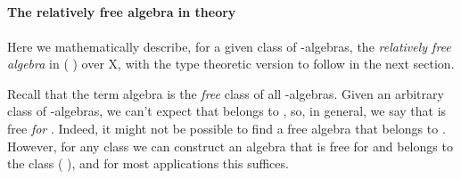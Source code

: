 \begin{code}%
\>[0]\<%
\\
%
\>[1]\AgdaSpace{}%
\AgdaSymbol{:}\AgdaSpace{}%
\AgdaSymbol{(}\AgdaSpace{}%
\AgdaSymbol{:}\AgdaSpace{}%
\AgdaSpace{}%
\AgdaSpace{}%
\AgdaOperator{\AgdaFunction{𝕌[}}\AgdaSpace{}%
\AgdaSpace{}%
\AgdaOperator{\AgdaFunction{]}}\AgdaSymbol{)(}\AgdaSpace{}%
\AgdaSymbol{:}\AgdaSpace{}%
\AgdaSpace{}%
\AgdaSymbol{)}\AgdaSpace{}%
\AgdaSpace{}%
\AgdaSpace{}%
\AgdaSpace{}%
\AgdaSpace{}%
\AgdaSpace{}%
\AgdaSpace{}%
\AgdaSpace{}%
\AgdaSymbol{(}\AgdaSymbol{\{}\AgdaSpace{}%
\AgdaSymbol{=}\AgdaSpace{}%
\AgdaSymbol{\}}\AgdaSpace{}%
\AgdaSymbol{)}\AgdaSpace{}%
\<%
\\
%
\>[1]\AgdaSpace{}%
\AgdaSpace{}%
\AgdaSymbol{(}\AgdaSpace{}%
\AgdaSymbol{)}%
\>[32]\AgdaSymbol{=}\AgdaSpace{}%
\<%
\\
%
\>[1]\AgdaSpace{}%
\AgdaSpace{}%
\AgdaSymbol{(}\AgdaSpace{}%
\AgdaSpace{}%
\AgdaSymbol{)}%
\>[32]\AgdaSymbol{=}\AgdaSpace{}%
\AgdaSpace{}%
\AgdaSymbol{(}\AgdaSpace{}%
\AgdaSymbol{)}\AgdaSpace{}%
\AgdaSymbol{(}\AgdaSpace{}%
\AgdaOperator{\AgdaInductiveConstructor{,}}\AgdaSpace{}%
\AgdaSymbol{(}\AgdaSpace{}%
\AgdaSymbol{)}\AgdaSpace{}%
\AgdaSpace{}%
\AgdaSymbol{)}\<%
\end{code}

\paragraph*{The relatively free algebra in theory}
Here we mathematically describe, for a given class  of -algebras, the
\emph{relatively free algebra} in  ( ) over \ab X, with the
type theoretic version to follow in the next section.

Recall that the term algebra  is the \emph{free} class of all
-algebras. Given an arbitrary class  of -algebras, we can't expect that
 belongs to , so, in general, we say that  is free \emph{for} .
\ifshort\else
Indeed, it might not be possible to find a free algebra that belongs to .
\fi
However, for any class  we can construct an algebra that is free for 
and belongs to the class  ( ), and for most applications this suffices.

